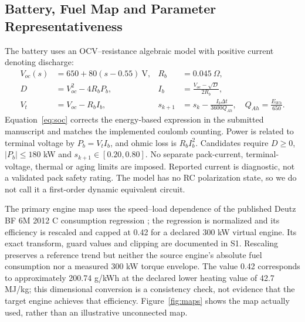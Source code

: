 \documentclass[energies,article,submit,moreauthors]{Definitions/mdpi}
\begin{document}
\subsection{Battery, Fuel Map and Parameter Representativeness}
The battery uses an OCV--resistance algebraic model with positive current denoting discharge:
\begin{align}
 V_{oc}(s)&=650+80(s-0.55)\ \mathrm{V},&R_b&=0.045\ \Omega,\\
 D&=V_{oc}^2-4R_bP_b,& I_b&=\frac{V_{oc}-\sqrt{D}}{2R_b},\label{eq:battery}\\
 V_t&=V_{oc}-R_bI_b,&
 s_{k+1}&=s_k-\frac{I_b\Delta t}{3600Q_{Ah}},\quad Q_{Ah}=\frac{E_{Wh}}{650}.
 \label{eq:soc}
\end{align}
Equation~\ref{eq:soc} corrects the energy-based expression in the submitted manuscript and matches the implemented coulomb counting. Power is related to terminal voltage by $P_b=V_tI_b$, and ohmic loss is $R_bI_b^2$. Candidates require $D\geq0$, $|P_b|\leq180$ kW and $s_{k+1}\in[0.20,0.80]$. No separate pack-current, terminal-voltage, thermal or aging limits are imposed. Reported current is diagnostic, not a validated pack safety rating. The model has no RC polarization state, so we do not call it a first-order dynamic equivalent circuit.

The primary engine map uses the speed--load dependence of the published Deutz BF 6M 2012 C consumption regression \cite{devyanin2023}; the regression is normalized and its efficiency is rescaled and capped at 0.42 for a declared 300 kW virtual engine. Its exact transform, guard values and clipping are documented in S1. Rescaling preserves a reference trend but neither the source engine's absolute fuel consumption nor a measured 300 kW torque envelope. The value 0.42 corresponds to approximately 200.74 g/kWh at the declared lower heating value of 42.7 MJ/kg; this dimensional conversion is a consistency check, not evidence that the target engine achieves that efficiency. Figure~\ref{fig:maps} shows the map actually used, rather than an illustrative unconnected map.
\end{document}
